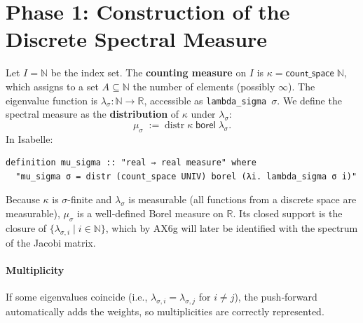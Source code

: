 \documentclass[12pt,a4paper]{article}
\begin{document}
\section{Phase 1: Construction of the Discrete Spectral Measure}
Let $I = \mathbb{N}$ be the index set.  The \textbf{counting measure} on $I$ is
$\kappa = \mathsf{count\_space}\; \mathbb{N}$, which assigns to a set $A\subseteq\mathbb{N}$ 
the number of elements (possibly $\infty$).  The eigenvalue function is 
$\lambda_{\sigma} : \mathbb{N} \to \mathbb{R}$, accessible as \texttt{lambda\_sigma $\sigma$}.
We define the spectral measure as the \textbf{distribution} of $\kappa$ under $\lambda_{\sigma}$:
\[
\mu_\sigma \;:=\; \mathrm{distr}\; \kappa\; \mathsf{borel}\; \lambda_{\sigma}.
\]
In Isabelle:
\begin{verbatim}
definition mu_sigma :: "real ⇒ real measure" where
  "mu_sigma σ = distr (count_space UNIV) borel (λi. lambda_sigma σ i)"
\end{verbatim}
Because $\kappa$ is $\sigma$-finite and $\lambda_\sigma$ is measurable (all functions from a 
discrete space are measurable), $\mu_\sigma$ is a well‑defined Borel measure on $\mathbb{R}$.  
Its closed support is the closure of $\{\lambda_{\sigma,i}\mid i\in\mathbb{N}\}$, which by 
AX6g will later be identified with the spectrum of the Jacobi matrix.

\paragraph{Multiplicity} If some eigenvalues coincide (i.e., $\lambda_{\sigma,i} = 
\lambda_{\sigma,j}$ for $i\neq j$), the push‑forward automatically adds the weights, so 
multiplicities are correctly represented.
\end{document}
